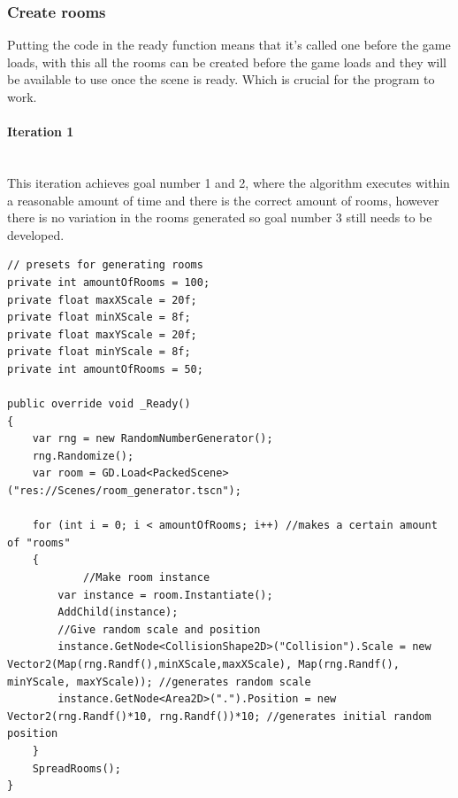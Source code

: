 \documentclass{article}
\newcommand{\myparagraph}[1]{\paragraph{#1}\mbox{}\\} %
\begin{document}
\subsubsection{Create rooms}
Putting the code in the ready function means that it's called one before the game loads, with this all the rooms can be created before the game loads and they will be available to use once the scene is ready. Which is crucial for the program to work.
\myparagraph{Iteration 1}
This iteration achieves goal number 1 and 2, where the algorithm executes within a reasonable amount of time and there is the correct amount of rooms, however there is no variation in the rooms generated so goal number 3 still needs to be developed.
\begin{lstlisting}
// presets for generating rooms
private int amountOfRooms = 100;
private float maxXScale = 20f;
private float minXScale = 8f;
private float maxYScale = 20f;
private float minYScale = 8f;
private int amountOfRooms = 50;

public override void _Ready()
{
    var rng = new RandomNumberGenerator();
    rng.Randomize();
    var room = GD.Load<PackedScene>("res://Scenes/room_generator.tscn");

    for (int i = 0; i < amountOfRooms; i++) //makes a certain amount of "rooms"
    {
    	    //Make room instance
        var instance = room.Instantiate();
        AddChild(instance);
        //Give random scale and position
        instance.GetNode<CollisionShape2D>("Collision").Scale = new Vector2(Map(rng.Randf(),minXScale,maxXScale), Map(rng.Randf(), minYScale, maxYScale)); //generates random scale
        instance.GetNode<Area2D>(".").Position = new Vector2(rng.Randf()*10, rng.Randf())*10; //generates initial random position
    }
    SpreadRooms();
}
\end{lstlisting}
\end{document}
